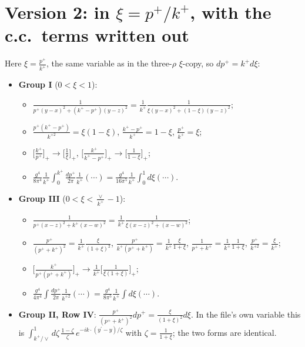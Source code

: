 \documentclass[10pt]{article}
\numberwithin{equation}{section}
\begin{document}
\section{Version 2: in $\xi=p^{+}/k^{+}$, with the c.c.\ terms written out}
\noindent Here $\xi=\frac{p^{+}}{k^{+}}$, the same variable as in the three-$\rho$ $\xi$-copy, so $dp^{+}=k^{+}d\xi$:
\begin{itemize}
\item \textbf{Group I} ($0<\xi<1$):
\begin{itemize}
\item $\frac{1}{p^{+}(y-x)^{2}+(k^{+}-p^{+})(y-z)^{2}}=\frac{1}{k^{+}}\frac{1}{\xi(y-x)^{2}+(1-\xi)(y-z)^{2}}$;
\item $\frac{p^{+}(k^{+}-p^{+})}{k^{+2}}=\xi(1-\xi)$, $\frac{k^{+}-p^{+}}{k^{+}}=1-\xi$, $\frac{p^{+}}{k^{+}}=\xi$;
\item $\big[\frac{k^{+}}{p^{+}}\big]_{+}\to\big[\frac1\xi\big]_{+}$, $\big[\frac{k^{+}}{k^{+}-p^{+}}\big]_{+}\to\big[\frac{1}{1-\xi}\big]_{+}$;
\item $\frac{g^{4}}{8\pi^{4}}\frac{1}{k^{+}}\int_{0}^{k^{+}}\frac{dp^{+}}{2\pi}\frac{1}{k^{+}}(\cdots)=\frac{g^{4}}{16\pi^{5}}\frac{1}{k^{+}}\int_{0}^{1}d\xi(\cdots)$.
\end{itemize}
\item \textbf{Group III} ($0<\xi<\frac{\vee}{k^{+}}-1$):
\begin{itemize}
\item $\frac{1}{p^{+}(x-z)^{2}+k^{+}(x-w)^{2}}=\frac{1}{k^{+}}\frac{1}{\xi(x-z)^{2}+(x-w)^{2}}$;
\item $\frac{p^{+}}{(p^{+}+k^{+})^{2}}=\frac{1}{k^{+}}\frac{\xi}{(1+\xi)^{2}}$, $\frac{p^{+}}{k^{+}(p^{+}+k^{+})}=\frac{1}{k^{+}}\frac{\xi}{1+\xi}$, $\frac{1}{p^{+}+k^{+}}=\frac{1}{k^{+}}\frac{1}{1+\xi}$, $\frac{p^{+}}{k^{+2}}=\frac{\xi}{k^{+}}$;
\item $\big[\frac{k^{+}}{p^{+}(p^{+}+k^{+})}\big]_{+}\to\frac{1}{k^{+}}\big[\frac{1}{\xi(1+\xi)}\big]_{+}$;
\item $\frac{g^{4}}{4\pi^{4}}\int\frac{dp^{+}}{2\pi}\frac{1}{k^{+2}}(\cdots)=\frac{g^{4}}{8\pi^{5}}\frac{1}{k^{+}}\int d\xi(\cdots)$.
\end{itemize}
\item \textbf{Group II, Row IV}: $\frac{p^{+}}{(p^{+}+k^{+})^{2}}dp^{+}=\frac{\xi}{(1+\xi)^{2}}d\xi$. In the file's own variable this is $\int_{k^{+}/\vee}^{1}d\zeta\,\frac{1-\zeta}{\zeta}\,e^{-ik\cdot(y^{\prime}-y)/\zeta}$ with $\zeta=\frac{1}{1+\xi}$; the two forms are identical.
\end{itemize}
\end{document}
